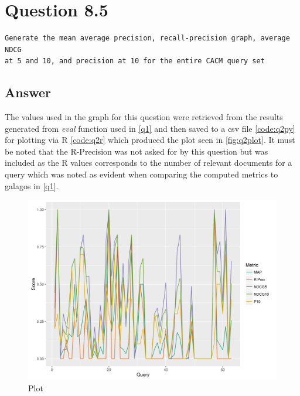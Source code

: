 \documentclass[11pt]{article}
\newenvironment{code}{\captionsetup{type=listing}}{}
\begin{document}
\section{Question 8.5} \label{q2}
\begin{verbatim}
Generate the mean average precision, recall-precision graph, average NDCG
at 5 and 10, and precision at 10 for the entire CACM query set
\end{verbatim}
\subsection{Answer} 
The values used in the graph for this question were retrieved from the results generated from \textit{eval} function used in \autoref{q1} and then saved to a csv file \autoref{code:q2py} for plotting via R \autoref{code:q2r} which produced the plot seen in \autoref{fig:q2plot}. It must be noted that the R-Precision was not asked for by this question but was included as the R values corresponds to the number of relevant documents for a query which was noted as evident when comparing the computed metrics to galagos in \autoref{q1}.
\begin{figure}[H]
\centering
\includegraphics[scale=0.9]{q2_plot.png}
\caption{Plot}
\label{fig:q2plot}
\end{figure}
\begin{code}
\label{code:q2py}
\end{code}
\begin{code}
\label{code:q2r}
\end{code}
\begin{code}
\label{code:q1rnk}
\end{code}
\newpage
\begin{code}
\label{code:cntx}
\end{code}
\newpage
\begin{code}
\label{code:cacm_help}
\end{code}
\end{document}
